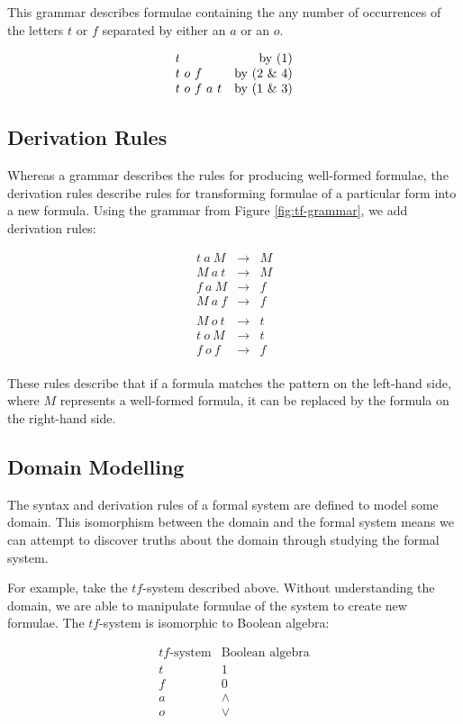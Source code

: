 This grammar describes formulae containing the any number of occurrences of
the letters $t$ or $f$ separated by either an $a$ or an $o$.

\[
\begin{array}{lr}
  t & \text{by (1)} \\
  t\ o\ f & \text{by (2 \& 4)} \\
  t\ o\ f\ a\ t & \text{by (1 \& 3)}
\end{array}
\]

\subsection{Derivation Rules}
Whereas a grammar describes the rules for producing well-formed formulae,
the derivation rules describe rules for transforming formulae of a
particular form into a new formula. Using the grammar from Figure 
\ref{fig:tf-grammar}, we add derivation rules:

\[
\begin{array}{lcl}
  t\ a\ M &\to& M \\ 
  M\ a\ t &\to& M \\
  f\ a\ M &\to& f \\
  M\ a\ f &\to& f \\
  \\
  M\ o\ t &\to& t \\ 
  t\ o\ M &\to& t \\
  f\ o\ f &\to& f \\
\end{array}
\]

These rules describe that if a formula matches the pattern on the 
left-hand side, where $M$ represents a well-formed formula, it can be
replaced by the formula on the right-hand side.

\subsection{Domain Modelling}

The syntax and derivation rules of a formal system are defined to model 
some domain. This isomorphism between the domain and the formal system
means we can attempt to discover truths about the domain through studying
the formal system.

For example, take the $tf$-system described above. Without
understanding the domain, we are able to manipulate formulae of the
system to create new formulae. The $tf$-system is isomorphic to
Boolean algebra:

\[
\begin{array}{cc}
\text{$tf$-system} & \text{Boolean algebra} \\
t & 1 \\
f & 0 \\
a & \wedge \\
o & \vee 
\end{array}
\]


